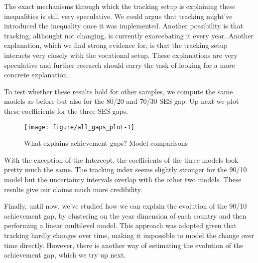 \documentclass[11pt, a4paper]{article}\usepackage[]{graphicx}\usepackage[]{color}
\begin{document}
The exact mechanisms through whick the tracking setup is explaining these inequalities is still very speculative. We could argue that tracking might've introduced the inequality once it was implemented. Another possibility is that tracking, althought not changing, is currently exarcebating it every year. Another explanation, which we find strong evidence for, is that the tracking setup interacts very closely with the vocational setup. These explanations are very speculative and further research should carry the task of looking for a more concrete explanation.


To test whether these results hold for other samples, we compute the same models as before but also for the 80/20 and 70/30 SES gap. Up next we plot these coefficients for the three SES gaps.



\begin{figure}

{\centering \texttt{[image: figure/all\_gaps\_plot-1]} 

}

\caption[What explains achievement gaps? Model comparisons]{What explains achievement gaps? Model comparisons}\label{fig:all_gaps_plot}
\end{figure}



With the exception of the Intercept, the coefficients of the three models look pretty much the same. The tracking index seems slightly stronger for the 90/10 model but the uncertainty intervals overlap with the other two models. These results give our claims much more credibility.

Finally, until now, we've studied how we can explain the evolution of the 90/10 achievement gap, by clustering on the year dimension of each country and then performing a linear multilevel model. This approach was adopted given that tracking hardly changes over time, making it impossible to model the change over time directly. However, there is another way of estimating the evolution of the achievement gap, which we try up next.
\end{document}
